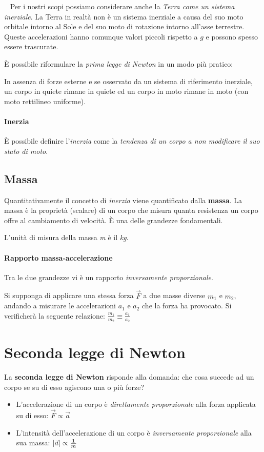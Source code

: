 \documentclass[a4paper,11pt,oneside]{book}
\begin{document}
~\newline
Per i nostri scopi possiamo considerare anche la \emph{Terra come un sistema inerziale}. La Terra in realtà non è un sistema inerziale a causa del suo moto
orbitale intorno al Sole e del suo moto di rotazione intorno all’asse terrestre.
Queste accelerazioni hanno comunque valori piccoli rispetto a $g$ e possono spesso essere trascurate.

\noindent È possibile riformulare la \emph{prima legge di Newton} in un modo più pratico:
\begin{displayquote}
    \centering
    In assenza di forze esterne e se osservato da un sistema di riferimento inerziale, un corpo in quiete rimane in quiete ed un
    corpo in moto rimane in moto (con moto rettilineo uniforme).
\end{displayquote}

\paragraph{Inerzia} È possibile definire l'\emph{inerzia} come la \emph{tendenza di un corpo a non modificare il suo stato di moto}.

\subsection{Massa}
Quantitativamente il concetto di \emph{inerzia} viene quantificato dalla \textbf{massa}. La massa è la proprietà (scalare) di un corpo che misura
quanta resistenza un corpo offre al cambiamento di velocità. È una delle grandezze fondamentali.

L'unità di misura della massa \emph{m} è il \emph{kg}.

\paragraph{Rapporto massa-accelerazione}
Tra le due grandezze vi è un rapporto \emph{inversamente proporzionale}.

Si supponga di applicare una stessa forza $\vec{F}$ a due masse diverse $m_1$ e $m_2$, andando a misurare le accelerazioni $a_1$ e $a_2$ che la forza ha provocato.
Si verificherà la seguente relazione: $\frac{m_1}{m_2} \equiv \frac{a_1}{a_2}$

\newpage
\section{Seconda legge di Newton}
La \textbf{seconda legge di Newton} risponde alla domanda: che cosa succede ad un corpo se su di esso agiscono una o più forze?
\begin{itemize}
    \item L’accelerazione di un corpo è \emph{direttamente proporzionale} alla forza applicata su di esso: $\vec{F} \propto \vec{a}$
    \item L'intensità dell'accelerazione di un corpo è \emph{inversamente proporzionale} alla sua massa: $\abs{\vec{a}} \propto \tfrac{1}{m}$
\end{itemize}
\end{document}
